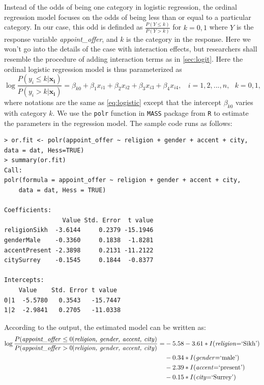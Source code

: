 \documentclass[11pt]{article}
\begin{document}
Instead of the odds of being one category in logistic regression, the ordinal regression model focuses on the odds of being less than or equal to a particular category. In our case, this odd is definded as $ \frac{P(Y\leq k)}{P(Y > k)}$ for $k = 0,1$ where $Y$ is the response variable \textit{appoint\_offer}, and $k$ is the category in the response. Here we won't go into the details of the case with interaction effects, but researchers shall resemble the procedure of adding interaction terms as in \autoref{sec:logit}. Here the ordinal logistic regression model is thus parameterized as
\begin{equation}
    \log \frac{P(y_i\leq k|\mathbf{x_i})}{P(y_i > k|\mathbf{x_i})} = \beta_{k0} + \beta_1x_{i1} + \beta_2x_{i2} + \beta_3x_{i3} + \beta_4x_{i4},\ \ \ \ i=1,2,...,n,\ \ \ k=0,1,
    \label{eq:ordinal}
\end{equation}
where notations are the same as \autoref{eq:logistic} except that the intercept $\beta_{k0}$ varies with category $k$. We use the \texttt{polr} function in \texttt{MASS} package from \texttt{R} to estimate the parameters in the regression model. The sample code runs as follows:
\begin{verbatim}
> or.fit <- polr(appoint_offer ~ religion + gender + accent + city, data = dat, Hess=TRUE)
> summary(or.fit)
Call:
polr(formula = appoint_offer ~ religion + gender + accent + city, 
    data = dat, Hess = TRUE)

Coefficients:
                Value Std. Error  t value
religionSikh  -3.6144     0.2379 -15.1946
genderMale    -0.3360     0.1838  -1.8281
accentPresent -2.3898     0.2131 -11.2122
citySurrey    -0.1545     0.1844  -0.8377

Intercepts:
    Value    Std. Error t value 
0|1  -5.5780   0.3543   -15.7447
1|2  -2.9841   0.2705   -11.0338
\end{verbatim}
According to the output, the estimated model can be written as:
\begin{equation}
    \begin{split}
    \log \frac{P(\textnormal{\textit{appoint\_offer}} \leq 0 |\textnormal{\textit{religion, gender, accent, city}})}{P(\textnormal{\textit{appoint\_offer}} > 0|\textnormal{\textit{religion, gender, accent, city}})}  = & -5.58 - 3.61*I\textnormal{(\textit{religion}=`Sikh')} \\ & -0.34 *I\textnormal{(\textit{gender}=`male')}   \\
    & -2.39*I\textnormal{(\textit{accent}=`present')} \\ &   -0.15*I\textnormal{(\textit{city}=`Surrey')} 
    \end{split}
\end{equation}
\end{document}
